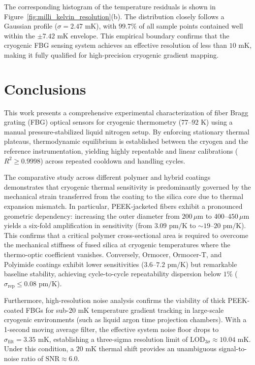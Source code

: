 \documentclass[preprint,11pt]{elsarticle}
\begin{document}
The corresponding histogram of the temperature residuals is shown in Figure~\ref{fig:milli_kelvin_resolution}(b). The distribution closely follows a Gaussian profile ($\sigma = 2.47\text{ mK}$), with $99.7\%$ of all sample points contained well within the $\pm 7.42\text{ mK}$ envelope. This empirical boundary confirms that the cryogenic FBG sensing system achieves an effective resolution of less than $10\text{ mK}$, making it fully qualified for high-precision cryogenic gradient mapping.

\section{Conclusions}
\label{sec:conclusions}

This work presents a comprehensive experimental characterization of fiber Bragg grating (FBG) optical sensors for cryogenic thermometry ($77\text{--}92\text{ K}$) using a manual pressure-stabilized liquid nitrogen setup. By enforcing stationary thermal plateaus, thermodynamic equilibrium is established between the cryogen and the reference instrumentation, yielding highly repeatable and linear calibrations ($R^2 \ge 0.9998$) across repeated cooldown and handling cycles.

The comparative study across different polymer and hybrid coatings demonstrates that cryogenic thermal sensitivity is predominantly governed by the mechanical strain transferred from the coating to the silica core due to thermal expansion mismatch. In particular, PEEK-jacketed fibers exhibit a pronounced geometric dependency: increasing the outer diameter from $200\,\mu\text{m}$ to $400\text{--}450\,\mu\text{m}$ yields a six-fold amplification in sensitivity (from $3.09\text{ pm/K}$ to $\sim 19\text{--}20\text{ pm/K}$). This confirms that a critical polymer cross-sectional area is required to overcome the mechanical stiffness of fused silica at cryogenic temperatures where the thermo-optic coefficient vanishes. Conversely, Ormocer, Ormocer-T, and Polyimide coatings exhibit lower sensitivities ($3.6\text{--}7.2\text{ pm/K}$) but remarkable baseline stability, achieving cycle-to-cycle repeatability dispersion below $1\%$ ($\sigma_{\text{rep}} \le 0.08\text{ pm/K}$).

Furthermore, high-resolution noise analysis confirms the viability of thick PEEK-coated FBGs for sub-$20\text{ mK}$ temperature gradient tracking in large-scale cryogenic environments (such as liquid argon time projection chambers). With a 1-second moving average filter, the effective system noise floor drops to $\sigma_{\text{filt}} = 3.35\text{ mK}$, establishing a three-sigma resolution limit of $\text{LOD}_{3\sigma} \approx 10.04\text{ mK}$. Under this condition, a $20\text{ mK}$ thermal shift provides an unambiguous signal-to-noise ratio of $\text{SNR} \approx 6.0$.
\end{document}
